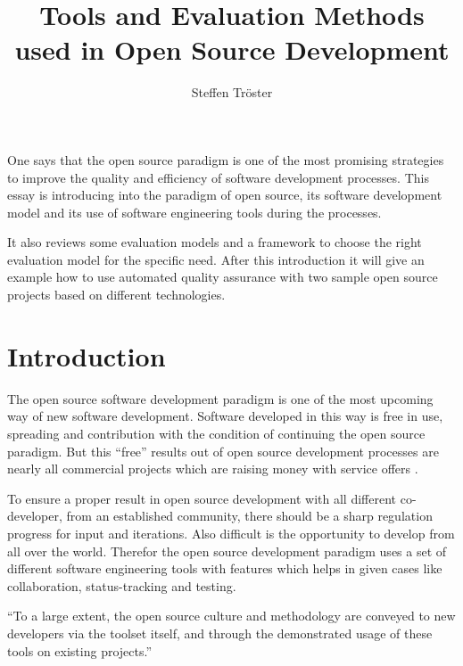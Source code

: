 \documentclass[DIV=calc,paper=a4,fontsize=9pt,twocolumn]{scrartcl}
\title{Tools and Evaluation Methods used in Open Source Development}    %
\author{Steffen Tröster \\}											%
\date{}																%
\newcommand{\initial}[1]{%
     \lettrine[lines=2,lhang=0.3,nindent=0em]{
                    \color{headblue}
                    {\textsf{#1}}}{}}
\begin{document}
\maketitle
\thispagestyle{fancy}		%
\initial{O}ne says that the open source paradigm is one of the most promising strategies to improve the quality and efficiency of software development processes. This essay is introducing into the paradigm of open source, its software development model and its use of software engineering tools during the processes.

It also reviews some evaluation models and a framework to choose the right evaluation model for the specific need. After this introduction it will give an example how to use automated quality assurance with two sample open source projects based on different technologies.


\section{Introduction}

The open source software development paradigm is one of the most upcoming way of new software development. Software developed in this way is free in use, spreading and contribution with the condition of continuing the open source paradigm. But this \enquote{free} results out of open source development processes are nearly all commercial projects which are raising money with service offers \citep{Wheeler}.

To ensure a proper result in open source development with all different co-developer, from an established community, there should be a sharp regulation progress for input and iterations. Also difficult is the opportunity to develop from all over the world. Therefor the open source development paradigm uses a set of different software engineering tools with features which helps in given cases like collaboration, status-tracking and testing.

\enquote{To a large extent, the open source culture and methodology are conveyed to new developers via the toolset itself, and through the demonstrated usage of these tools on existing projects.} \citep{Robbins02adoptingoss}
\end{document}

